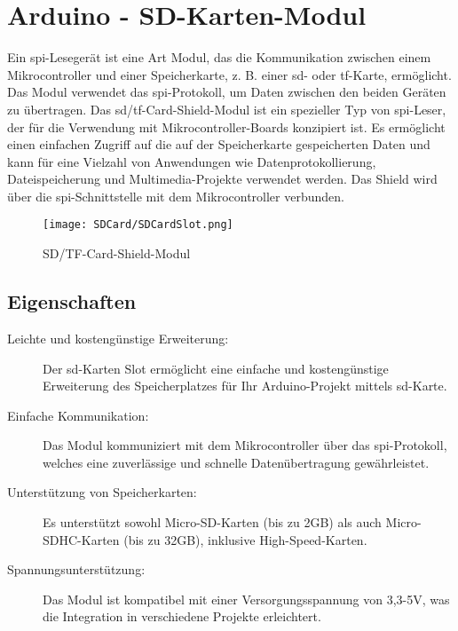 %
%

\chapter{Arduino - SD-Karten-Modul}

Ein \ac{spi}-Lesegerät ist eine Art Modul, das die Kommunikation zwischen einem Mikrocontroller und einer Speicherkarte, z. B. einer \ac{sd}- oder \ac{tf}-Karte, ermöglicht. Das Modul verwendet das \ac{spi}-Protokoll, um Daten zwischen den beiden Geräten zu übertragen. Das \ac{sd}/\ac{tf}-Card-Shield-Modul ist ein spezieller Typ von \ac{spi}-Leser, der für die Verwendung mit Mikrocontroller-Boards konzipiert ist. Es ermöglicht einen einfachen Zugriff auf die auf der Speicherkarte gespeicherten Daten und kann für eine Vielzahl von Anwendungen wie Datenprotokollierung, Dateispeicherung und Multimedia-Projekte verwendet werden. Das Shield wird über die \ac{spi}-Schnittstelle mit dem Mikrocontroller verbunden.

\begin{figure}[h]
    \begin{center}
        \texttt{[image: SDCard/SDCardSlot.png]}
        \caption{SD/TF-Card-Shield-Modul}
        \label{fig:SD_Slot}
    \end{center}
\end{figure}

\section{Eigenschaften}

\begin{description}
    \item[Leichte und kostengünstige Erweiterung:] Der \ac{sd}-Karten Slot ermöglicht eine einfache und kostengünstige Erweiterung des Speicherplatzes für Ihr Arduino-Projekt mittels \ac{sd}-Karte.
    \item[Einfache Kommunikation:] Das Modul kommuniziert mit dem Mikrocontroller über das \ac{spi}-Protokoll, welches eine zuverlässige und schnelle Datenübertragung gewährleistet.
    \item[Unterstützung von Speicherkarten:] Es unterstützt sowohl Micro-SD-Karten (bis zu 2GB) als auch Micro-SDHC-Karten (bis zu 32GB), inklusive High-Speed-Karten.
    \item[Spannungsunterstützung:] Das Modul ist kompatibel mit einer Versorgungsspannung von 3,3-5V, was die Integration in verschiedene Projekte erleichtert.
\end{description}

